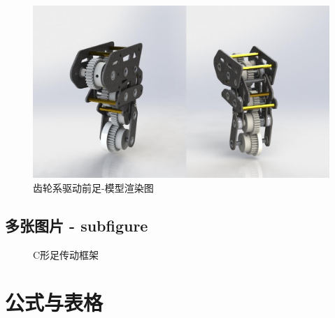 \documentclass[a4paper, 11pt]{article}   %
\begin{document}
\begin{CJK}{UTF8}{gbsn}
\begin{spacing}{1.15}
\begin{figure}[H]
\centering
\includegraphics[width=.8\textwidth]{chap2//figa.jpg}
\caption{齿轮系驱动前足-模型渲染图}
\end{figure}

\subsection{多张图片 - subfigure}

\begin{figure}[H]
{}
\quad
{}
\quad
\caption{C形足传动框架}
\end{figure}
\newpage
\section{公式与表格}

\end{spacing}
\end{CJK}
\end{document}
